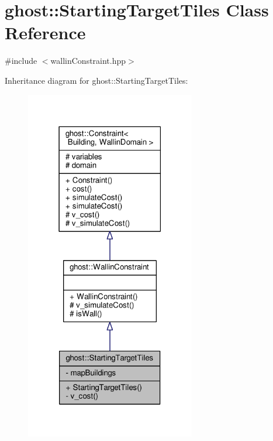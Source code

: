 \hypertarget{classghost_1_1StartingTargetTiles}{\section{ghost\-:\-:Starting\-Target\-Tiles Class Reference}
\label{classghost_1_1StartingTargetTiles}
}


{\ttfamily \#include $<$wallin\-Constraint.\-hpp$>$}



Inheritance diagram for ghost\-:\-:Starting\-Target\-Tiles\-:\nopagebreak
\begin{figure}[H]
\begin{center}
\leavevmode
\includegraphics[width=210pt]{classghost_1_1StartingTargetTiles__inherit__graph}
\end{center}
\end{figure}


